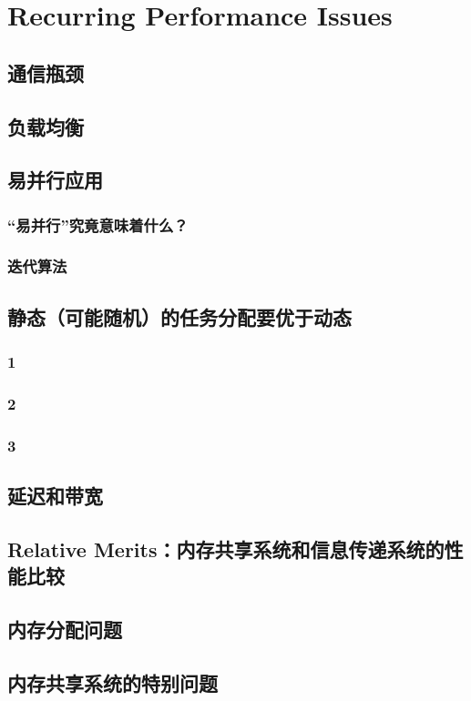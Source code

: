 ﻿%

\chapter{Recurring Performance Issues}
\label{chap:issues}
\section{通信瓶颈}

\section{负载均衡}

\section{易并行应用}
\label{embpar}

\subsection{``易并行''究竟意味着什么？}

\subsection{迭代算法}

\section{静态（可能随机）的任务分配要优于动态}

\subsection{1}
\subsection{2}
\subsection{3}
\label{mutlinks}


\section{延迟和带宽}

\section{Relative Merits：内存共享系统和信息传递系统的性能比较}

\section{内存分配问题}

\section{内存共享系统的特别问题}
